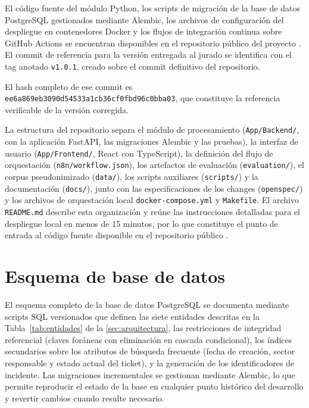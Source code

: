 El código fuente del módulo Python, los scripts de migración de la base de datos PostgreSQL gestionados mediante Alembic, los archivos de configuración del despliegue en contenedores Docker y los flujos de integración continua sobre GitHub Actions se encuentran disponibles en el repositorio público del proyecto \parencite{Gomez2026_repositorio}. El commit de referencia para la versión entregada al jurado se identifica con el tag anotado \texttt{v1.0.1}, creado sobre el commit definitivo del repositorio.

El hash completo de ese commit es \texttt{ee6a869eb3090d54533a1cb36cf0fbd96c0bba03}, que constituye la referencia verificable de la versión corregida.

La estructura del repositorio separa el módulo de procesamiento (\texttt{App/Backend/}, con la aplicación FastAPI, las migraciones Alembic y las pruebas), la interfaz de usuario (\texttt{App/Frontend/}, React con TypeScript), la definición del flujo de orquestación (\texttt{n8n/workflow.json}), los artefactos de evaluación (\texttt{evaluation/}), el corpus pseudonimizado (\texttt{data/}), los scripts auxiliares (\texttt{scripts/}) y la documentación (\texttt{docs/}), junto con las especificaciones de los changes (\texttt{openspec/}) y los archivos de orquestación local \texttt{docker-compose.yml} y \texttt{Makefile}. El archivo \texttt{README.md} describe esta organización y reúne las instrucciones detalladas para el despliegue local en menos de 15 minutos, por lo que constituye el punto de entrada al código fuente disponible en el repositorio público \parencite{Gomez2026_repositorio}.

\section{Esquema de base de datos}\label{sec:anexo-esquema-bd}

El esquema completo de la base de datos PostgreSQL se documenta mediante scripts SQL versionados que definen las siete entidades descritas en la Tabla~\ref{tab:entidades} de la \autoref{sec:arquitectura}, las restricciones de integridad referencial (claves foráneas con eliminación en cascada condicional), los índices secundarios sobre los atributos de búsqueda frecuente (fecha de creación, sector responsable y estado actual del ticket), y la generación de los identificadores de incidente. Las migraciones incrementales se gestionan mediante Alembic, lo que permite reproducir el estado de la base en cualquier punto histórico del desarrollo y revertir cambios cuando resulte necesario.

